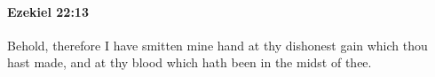 
		\paragraph{Ezekiel 22:13} %
			\label{EZEKIEL-22-13}

			Behold, therefore I have smitten mine hand at thy dishonest gain which thou hast made, and at thy blood which hath been in the midst of thee.


